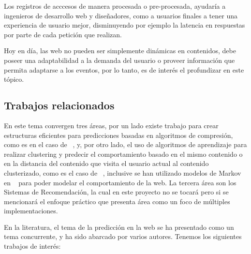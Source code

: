\documentclass{udparticle}
\begin{document}
  Los registros de acccesos de manera procesada o pre-procesada, ayudaría a ingenieros de desarrollo web y diseñadores, como a  usuarios finales a tener una experiencia de usuario mejor, disminuyendo por ejemplo la latencia en respuestas por parte de cada petición que realizan.
  
  Hoy en día, las web no pueden ser simplemente dinámicas en contenidos, debe poseer una adaptabilidad a la demanda del usuario o proveer información que permita adaptarse a los eventos, por lo tanto, es de interés el profundizar en este tópico.


\subsection{Trabajos relacionados}

En este tema convergen tres áreas, por un lado existe trabajo para crear estructuras eficientes para predicciones basadas en algoritmos de compresión, como es en el caso de ~\cite{Claude2014}, y, por otro lado, el uso de algoritmos de aprendizaje para realizar clustering y predecir el comportamiento basado en el mismo contenido o en la distancia del contenido que visita el usuario actual al contenido clusterizado, como es el caso de ~\cite{Poornalatha2012}, inclusive se han utilizado modelos de Markov en ~\cite{Dongshan2002}  para poder modelar el comportamiento de la web.
La tercera área son los Sistemas de Recomendación, la cual en este proyecto no se tocará pero si se mencionará el enfoque práctico que presenta área como un foco de múltiples implementaciones. 


En la literatura, el tema de la predicción en la web se ha presentado como un tema concurrente, y ha sido abarcado por varios autores. Tenemos los siguientes trabajos de interés:
\end{document}
